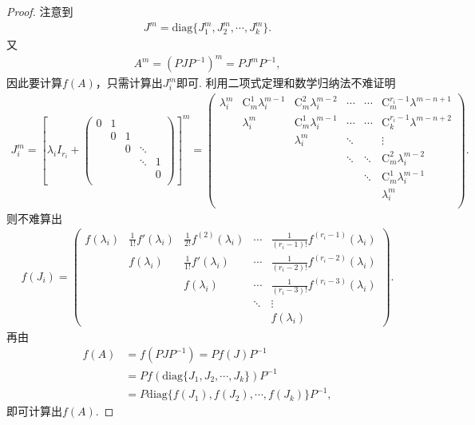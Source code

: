 \documentclass[../../main.tex]{subfiles}%
\begin{document}
\begin{proof}
注意到
\begin{align*}
J^m = \mathrm{diag}\{J_1^m,J_2^m,\cdots,J_k^m\}.
\end{align*}
又
\begin{align*}
A^m = (PJP^{-1})^m = PJ^mP^{-1},
\end{align*}
因此要计算\(f(A)\)，只需计算出\(J_i^m\)即可. 
利用二项式定理和数学归纳法不难证明
\begin{align*}
J_{i}^{m}=\left[ \lambda _iI_{r_i}+\left( \begin{matrix}
0&		1&		&		&		\\
&		0&		1&		&		\\
&		&		0&		\ddots&		\\
&		&		&		\ddots&		1\\
&		&		&		&		0\\
\end{matrix} \right) \right] ^m=\left( \begin{matrix}
\lambda _{i}^{m}&		\mathrm{C}_{m}^{1}\lambda _{i}^{m-1}&		\mathrm{C}_{m}^{2}\lambda _{i}^{m-2}&		\cdots&		\cdots&		\mathrm{C}_{m}^{r_i-1}\lambda ^{m-n+1}\\
&		\lambda _{i}^{m}&		\mathrm{C}_{m}^{1}\lambda _{i}^{m-1}&		\cdots&		\cdots&		\mathrm{C}_{k}^{r_i-1}\lambda ^{m-n+2}\\
&		&		\lambda _{i}^{m}&		\ddots&		&		\vdots\\
&		&		&		\ddots&		\ddots&		\mathrm{C}_{m}^{2}\lambda _{i}^{m-2}\\
&		&		&		&		\ddots&		\mathrm{C}_{m}^{1}\lambda _{i}^{m-1}\\
&		&		&		&		&		\lambda _{i}^{m}\\
\end{matrix} \right) .
\end{align*}
则不难算出
\begin{align*}
f(J_i)= \begin{pmatrix}
f(\lambda_i) & \frac{1}{1!}f'(\lambda_i) & \frac{1}{2!}f^{(2)}(\lambda_i) & \cdots & \frac{1}{(r_i - 1)!}f^{(r_i - 1)}(\lambda_i) \\
& f(\lambda_i) & \frac{1}{1!}f'(\lambda_i) & \cdots & \frac{1}{(r_i - 2)!}f^{(r_i - 2)}(\lambda_i) \\
& & f(\lambda_i) & \cdots & \frac{1}{(r_i - 3)!}f^{(r_i - 3)}(\lambda_i) \\
& & & \ddots & \vdots \\
& & & & f(\lambda_i)
\end{pmatrix}. 
\end{align*}
再由
\begin{align*}
f(A) &= f(PJP^{-1}) = Pf(J)P^{-1} \\
&= P f(\mathrm{diag}\{J_1,J_2,\cdots,J_k\})P^{-1} \\
&= P \mathrm{diag}\{f(J_1),f(J_2),\cdots,f(J_k)\}P^{-1},
\end{align*}
即可计算出\(f(A)\). 
\end{proof}
\end{document}
